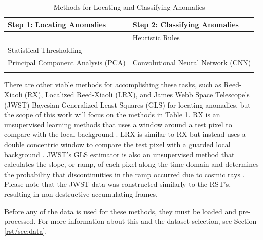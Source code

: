 \begin{table}
    \centering
    \begin{tabular}{|l|l|}
            \hline
        \textbf{Step 1: Locating Anomalies} & \textbf{Step 2: Classifying Anomalies} \\
                \hline

        & Heuristic Rules \\
        Statistical Thresholding& \parencite{cillis2018snowballs} \\
        \hline
        Principal Component Analysis (PCA) & Convolutional Neural Network (CNN)\\
        \parencite{cillis2018snowballs} & \parencite{gu2018recent} \\
                \hline

    \end{tabular}
    \caption{Methods for Locating and Classifying Anomalies}
    \label{rst/tab:methods}
\end{table}

There are other viable methods for accomplishing these tasks, such as Reed-Xiaoli (RX), Localized Reed-Xiaoli (LRX), and James Webb Space Telescope's (JWST) Bayesian Generalized Least Squares (GLS) for locating anomalies, but the scope of this work will focus on the methods in Table \ref{rst/tab:methods}.
RX is an unsupervised learning methods that uses a window around a test pixel to compare with the local background \parencite{reed1990adaptive}.
LRX is similar to RX but instead uses a double concentric window to compare the test pixel with a guarded local background \parencite{molero2013analysis}.
JWST's GLS estimator is also an unsupervised method that calculates the slope, or ramp, of each pixel along the time domain and determines the probability that discontinuities in the ramp occurred due to cosmic rays \parencite{robberto2015cr}.
Please note that the JWST data was constructed similarly to the RST's, resulting in non-destructive accumulating frames. 

Before any of the data is used for these methods, they must be loaded and pre-processed.
For more information about this and the dataset selection, see Section \ref{rst/sec:data}.

